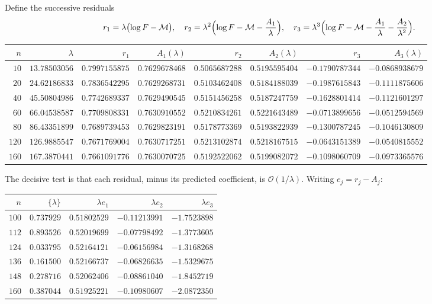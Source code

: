 \documentclass[11pt,oneside]{article}
\theoremstyle{definition}
\theoremstyle{remark}
\newcommand{\bigO}{\mathcal O}
\begin{document}
Define the successive residuals
\[
  r_1=\lambda\bigl(\log F-\mathcal M\bigr),\quad
  r_2=\lambda^2\Bigl(\log F-\mathcal M-\frac{A_1}{\lambda}\Bigr),\quad
  r_3=\lambda^3\Bigl(\log F-\mathcal M-\frac{A_1}{\lambda}-\frac{A_2}{\lambda^2}\Bigr).
\]

\begin{center}\small
\begin{tabular}{@{}rrrrrrrr@{}}
\toprule
$n$ & $\lambda$ & $r_1$ & $A_1(\lambda)$ & $r_2$ & $A_2(\lambda)$ & $r_3$ & $A_3(\lambda)$\\
\midrule
$10$ & $13.78503056$ & $0.7997155875$ & $0.7629678468$ & $0.5065687288$ & $0.5195595404$ & $-0.1790787344$ & $-0.0868938679$\\
$20$ & $24.62186833$ & $0.7836542295$ & $0.7629268731$ & $0.5103462408$ & $0.5184188039$ & $-0.1987615843$ & $-0.1111875606$\\
$40$ & $45.50804986$ & $0.7742689337$ & $0.7629490545$ & $0.5151456258$ & $0.5187247759$ & $-0.1628801414$ & $-0.1121601297$\\
$60$ & $66.04538587$ & $0.7709808331$ & $0.7630910552$ & $0.5210834261$ & $0.5221643489$ & $-0.0713899656$ & $-0.0512594569$\\
$80$ & $86.43351899$ & $0.7689739453$ & $0.7629823191$ & $0.5178773369$ & $0.5193822939$ & $-0.1300787245$ & $-0.1046130809$\\
$120$ & $126.9885547$ & $0.7671769004$ & $0.7630717251$ & $0.5213102874$ & $0.5218167515$ & $-0.0643151389$ & $-0.0540815552$\\
$160$ & $167.3870441$ & $0.7661091776$ & $0.7630070725$ & $0.5192522062$ & $0.5199082072$ & $-0.1098060709$ & $-0.0973365576$\\
\bottomrule
\end{tabular}
\end{center}

The decisive test is that each residual, minus its predicted coefficient, is
$\bigO(1/\lambda)$.  Writing $e_j=r_j-A_j$:

\begin{center}\small
\begin{tabular}{@{}rrrrr@{}}
\toprule
$n$ & $\{\lambda\}$ & $\lambda e_1$ & $\lambda e_2$ & $\lambda e_3$\\
\midrule
$100$ & $0.737929$ & $0.51802529$ & $-0.11213991$ & $-1.7523898$\\
$112$ & $0.893526$ & $0.52019699$ & $-0.07798492$ & $-1.3773605$\\
$124$ & $0.033795$ & $0.52164121$ & $-0.06156984$ & $-1.3168268$\\
$136$ & $0.161500$ & $0.52166737$ & $-0.06826635$ & $-1.5329675$\\
$148$ & $0.278716$ & $0.52062406$ & $-0.08861040$ & $-1.8452719$\\
$160$ & $0.387044$ & $0.51925221$ & $-0.10980607$ & $-2.0872350$\\
\bottomrule
\end{tabular}
\end{center}
\end{document}
